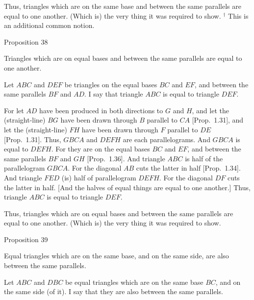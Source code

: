 Thus, triangles which are on the same base and between the same parallels
are equal to one another. (Which is) the very thing it was required to show.
{\footnotesize \noindent$^\dag$ This is an additional common notion.}


\begin{center}
{\large Proposition 38}
\end{center}

Triangles which are on equal bases and between the same parallels
are equal to one another.

\epsfysize=1.5in
\centerline{}

Let $ABC$ and $DEF$ be triangles on the equal bases $BC$ and $EF$, and between the same parallels $BF$ and $AD$. I say that triangle $ABC$ is equal to triangle $DEF$.

For let $AD$ have been produced in both directions to $G$ and $H$, and
let the (straight-line) $BG$ have been drawn through $B$ parallel to $CA$ [Prop.~1.31], and let the (straight-line) $FH$ have been drawn through
$F$ parallel to $DE$ [Prop.~1.31]. Thus,  $GBCA$ and $DEFH$ are
each parallelograms. And $GBCA$ is equal to $DEFH$.
For they are on the equal bases $BC$ and $EF$, and between  the same
parallels $BF$ and $GH$ [Prop.~1.36]. And triangle $ABC$ is half of the parallelogram
$GBCA$. For the diagonal $AB$ cuts the latter in half [Prop.~1.34]. And
triangle $FED$ (is) half of parallelogram $DEFH$. For the diagonal $DF$ cuts
the latter in half. [And the halves of equal things are equal to one another.] Thus,
triangle $ABC$ is equal to triangle $DEF$.

Thus, triangles which are on equal bases and between the same parallels
are equal to one another. (Which is) the very thing it was required to show.


\begin{center}
{\large Proposition 39}
\end{center}

Equal triangles which are on the same base, and on the same side, are
also between the same parallels.

Let $ABC$ and $DBC$ be equal triangles which are on the same base $BC$,
and on the same side (of it). I say that they are also between the same parallels.

